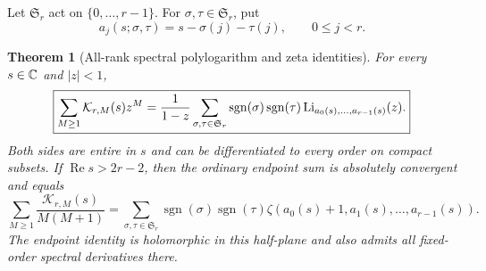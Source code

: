 \documentclass[11pt,letterpaper]{article}
\numberwithin{equation}{section}
\newtheorem{theorem}{Theorem}[section]
\theoremstyle{definition}\newtheorem{definition}[theorem]{Definition}
\theoremstyle{remark}\newtheorem{remark}[theorem]{Remark}
\begin{document}
Let $\mathfrak S_r$ act on $\{0,\ldots,r-1\}$. For
$\sigma,\tau\in\mathfrak S_r$, put
\begin{equation}\label{eq:asig}
             a_j(s;\sigma,\tau)=s-\sigma(j)-\tau(j),
                     \qquad 0\le j<r.
\end{equation}

\begin{theorem}[All-rank spectral polylogarithm and zeta identities]
\label{thm:spectral}
For every $s\in\mathbb C$ and $|z|<1$,
\begin{equation}\label{eq:spectralgen}
 \boxed{\displaystyle
 \sum_{M\ge1}\mathcal K_{r,M}(s)z^M
 =\frac1{1-z}\sum_{\sigma,\tau\in\mathfrak S_r}
       \operatorname{sgn}(\sigma)\operatorname{sgn}(\tau)
       \operatorname{Li}_{a_0(s),\ldots,a_{r-1}(s)}(z).}
\end{equation}
Both sides are entire in $s$ and can be differentiated to every order
on compact subsets. If $\operatorname{Re}s>2r-2$, then the ordinary
endpoint sum is absolutely convergent and equals
\begin{equation}\label{eq:spectralendpoint}
 \boxed{\displaystyle
 \sum_{M\ge1}\frac{\mathcal K_{r,M}(s)}{M(M+1)}
 =\sum_{\sigma,\tau\in\mathfrak S_r}
       \operatorname{sgn}(\sigma)\operatorname{sgn}(\tau)
       \zeta(a_0(s)+1,a_1(s),\ldots,a_{r-1}(s)).}
\end{equation}
The endpoint identity is holomorphic in this half-plane and also
admits all fixed-order spectral derivatives there.
\end{theorem}
\end{document}
